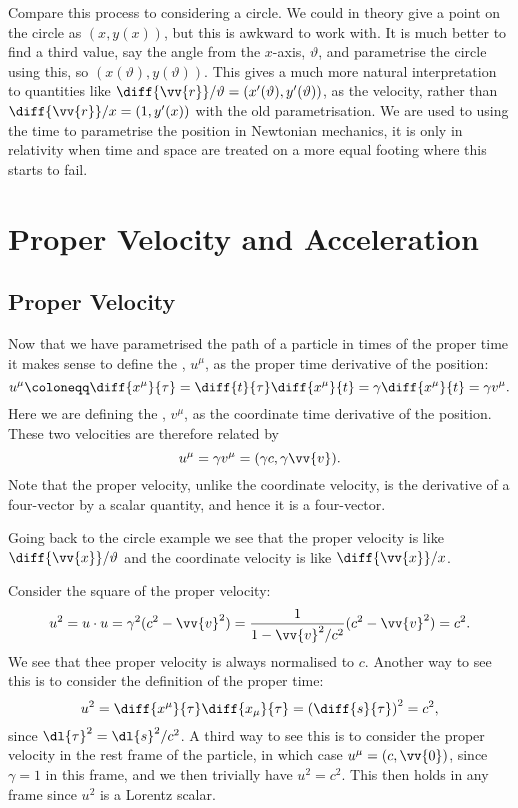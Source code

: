 Compare this process to considering a circle.
We could in theory give a point on the circle as \((x, y(x))\), but this is awkward to work with.
It is much better to find a third value, say the angle from the \(x\)-axis, \(\vartheta\), and parametrise the circle using this, so \((x(\vartheta), y(\vartheta))\).
This gives a much more natural interpretation to quantities like \(\diff{\vv{r}}/{\vartheta} = (x'(\vartheta), y'(\vartheta))\), as the velocity, rather than \(\diff{\vv{r}}/{x} = (1, y'(x))\) with the old parametrisation.
We are used to using the time to parametrise the position in Newtonian mechanics, it is only in relativity when time and space are treated on a more equal footing where this starts to fail.

\section{Proper Velocity and Acceleration}
\subsection{Proper Velocity}
Now that we have parametrised the path of a particle in times of the proper time it makes sense to define the , \(u^\mu\), as the proper time derivative of the position:
\begin{equation}
    u^\mu \coloneqq \diff{x^\mu}{\tau} = \diff{t}{\tau}\diff{x^\mu}{t} = \gamma\diff{x^\mu}{t} = \gamma v^\mu.
\end{equation}
Here we are defining the , \(v^\mu\), as the coordinate time derivative of the position.
These two velocities are therefore related by
\begin{equation}
    u^\mu = \gamma v^\mu = (\gamma c, \gamma\vv{v}).
\end{equation}
Note that the proper velocity, unlike the coordinate velocity, is the derivative of a four-vector by a scalar quantity, and hence it is a four-vector.

Going back to the circle example we see that the proper velocity is like \(\diff{\vv{x}}/{\vartheta}\) and the coordinate velocity is like \(\diff{\vv{x}}/{x}\).

Consider the square of the proper velocity:
\begin{equation}
    u^2 = u \cdot u = \gamma^2(c^2 - \vv{v}^2) = \frac{1}{1 - \vv{v}^2/c^2}(c^2 - \vv{v}^2) = c^2.
\end{equation}
We see that thee proper velocity is always normalised to \(c\).
Another way to see this is to consider the definition of the proper time:
\begin{equation}
    u^2 = \diff{x^\mu}{\tau}\diff{x_\mu}{\tau} = \left( \diff{s}{\tau} \right)^2 = c^2,
\end{equation}
since \(\dl{\tau}^2 = \dl{s}^2/c^2\).
A third way to see this is to consider the proper velocity in the rest frame of the particle, in which case \(u^\mu = (c, \vv{0})\), since \(\gamma = 1\) in this frame, and we then trivially have \(u^2 = c^2\).
This then holds in any frame since \(u^2\) is a Lorentz scalar.

